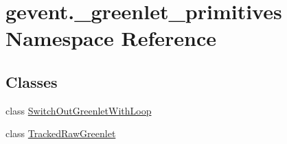 \hypertarget{namespacegevent_1_1__greenlet__primitives}{}\section{gevent.\+\_\+greenlet\+\_\+primitives Namespace Reference}
\label{namespacegevent_1_1__greenlet__primitives}
\subsection*{Classes}
\begin{DoxyCompactItemize}
\item 
class \hyperlink{classgevent_1_1__greenlet__primitives_1_1_switch_out_greenlet_with_loop}{Switch\+Out\+Greenlet\+With\+Loop}
\item 
class \hyperlink{classgevent_1_1__greenlet__primitives_1_1_tracked_raw_greenlet}{Tracked\+Raw\+Greenlet}
\end{DoxyCompactItemize}
